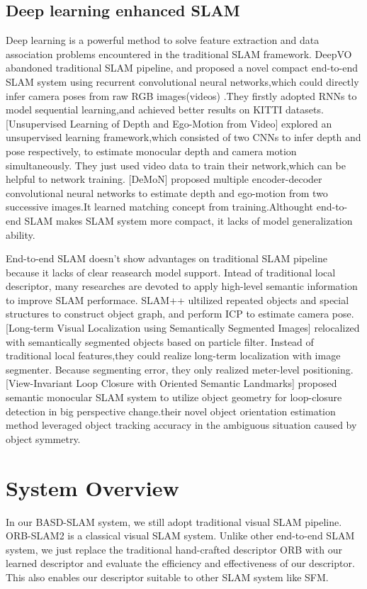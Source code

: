 \documentclass[letterpaper, 10 pt, conference]{ieeeconf}  %
\begin{document}
\subsection{Deep learning enhanced SLAM}
Deep learning is a powerful method to solve feature extraction and data association problems encountered in the traditional SLAM framework. 
DeepVO abandoned traditional SLAM pipeline, and proposed a novel compact end-to-end SLAM system using recurrent convolutional neural networks,which could directly infer camera poses from raw RGB images(videos) .They firstly adopted RNNs to model sequential learning,and achieved better results on KITTI datasets. 
[Unsupervised Learning of Depth and Ego-Motion from Video] explored an unsupervised learning framework,which consisted of two CNNs to infer depth and pose respectively, to estimate monocular depth and camera motion simultaneously. They just used video data to train their network,which can be helpful to network training.
[DeMoN] proposed multiple encoder-decoder convolutional neural networks to estimate depth and ego-motion from two successive images.It learned matching concept from training.Althought end-to-end SLAM makes SLAM system more compact, it lacks of model generalization ability.

End-to-end SLAM doesn't show advantages on traditional SLAM pipeline because it lacks of clear reasearch model support. Intead of traditional local descriptor, many researches are devoted to apply high-level semantic information to improve SLAM performace. 
SLAM++ ultilized repeated objects and special structures to construct object graph, and perform ICP to estimate camera pose.  
[Long-term Visual Localization using Semantically Segmented Images] relocalized with semantically segmented objects based on particle filter. Instead of traditional local features,they could realize long-term localization with image segmenter. Because segmenting error, they only realized meter-level positioning.  
[View-Invariant Loop Closure with Oriented Semantic Landmarks] proposed semantic monocular SLAM system  to utilize object geometry for loop-closure detection in big perspective change.their novel object orientation estimation method  leveraged object tracking accuracy in the ambiguous situation caused by object symmetry.



\section{System Overview}
In our BASD-SLAM system, we still adopt traditional visual SLAM pipeline. ORB-SLAM2 is a classical visual SLAM system. Unlike other end-to-end SLAM system, we just replace the traditional hand-crafted descriptor ORB with our learned descriptor and evaluate the efficiency and effectiveness of our descriptor. This also enables our descriptor suitable to other SLAM system like SFM.
\end{document}
